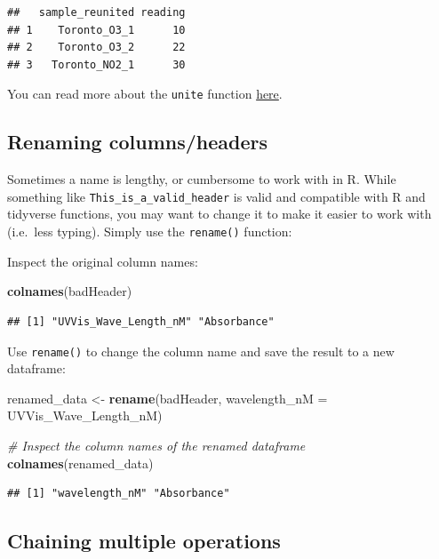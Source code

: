 \documentclass[
]{book}
\newenvironment{Shaded}{\begin{snugshade}}{\end{snugshade}}
\newcommand{\AttributeTok}[1]{\textcolor[rgb]{0.13,0.29,0.53}{#1}}
\newcommand{\CommentTok}[1]{\textcolor[rgb]{0.56,0.35,0.01}{\textit{#1}}}
\newcommand{\FunctionTok}[1]{\textcolor[rgb]{0.13,0.29,0.53}{\textbf{#1}}}
\newcommand{\NormalTok}[1]{#1}
\newcommand{\OtherTok}[1]{\textcolor[rgb]{0.56,0.35,0.01}{#1}}
\begin{document}
\begin{verbatim}
##   sample_reunited reading
## 1    Toronto_O3_1      10
## 2    Toronto_O3_2      22
## 3   Toronto_NO2_1      30
\end{verbatim}

You can read more about the \texttt{unite} function \href{https://tidyr.tidyverse.org/reference/unite.html}{here}.

\hypertarget{renaming-columnsheaders}{%
\subsection{Renaming columns/headers}\label{renaming-columnsheaders}}

Sometimes a name is lengthy, or cumbersome to work with in R. While something like \texttt{This\_is\_a\_valid\_header} is valid and compatible with R and tidyverse functions, you may want to change it to make it easier to work with (i.e.~less typing). Simply use the \texttt{rename()} function:

Inspect the original column names:

\begin{Shaded}
\begin{Highlighting}[]
\FunctionTok{colnames}\NormalTok{(badHeader)}
\end{Highlighting}
\end{Shaded}

\begin{verbatim}
## [1] "UVVis_Wave_Length_nM" "Absorbance"
\end{verbatim}

Use \texttt{rename()} to change the column name and save the result to a new dataframe:

\begin{Shaded}
\begin{Highlighting}[]
\NormalTok{renamed\_data }\OtherTok{\textless{}{-}} \FunctionTok{rename}\NormalTok{(badHeader, }\AttributeTok{wavelength\_nM =}\NormalTok{ UVVis\_Wave\_Length\_nM)}

\CommentTok{\# Inspect the column names of the renamed dataframe}
\FunctionTok{colnames}\NormalTok{(renamed\_data)}
\end{Highlighting}
\end{Shaded}

\begin{verbatim}
## [1] "wavelength_nM" "Absorbance"
\end{verbatim}

\hypertarget{chaining-multiple-operations}{%
\subsection{Chaining multiple operations}\label{chaining-multiple-operations}}
\end{document}
